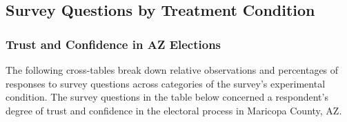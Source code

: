 \documentclass[
  11pt,
  a4paper,
]{article}
\begin{document}
\newpage{}

\subsection{Survey Questions by Treatment
Condition}\label{survey-questions-by-treatment-condition}

\subsubsection{Trust and Confidence in AZ
Elections}\label{trust-and-confidence-in-az-elections}

The following cross-tables break down relative observations and
percentages of responses to survey questions across categories of the
survey's experimental condition. The survey questions in the table below
concerned a respondent's degree of trust and confidence in the electoral
process in Maricopa County, AZ.
\end{document}
